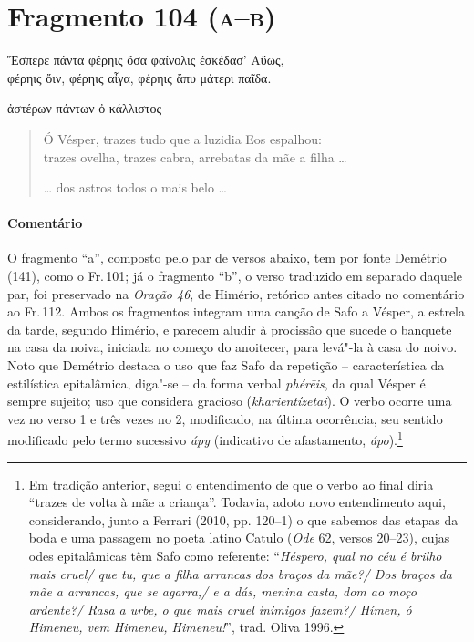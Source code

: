 \pagebreak
\section{Fragmento 104 (\textsc{a--b})}

\begin{gkverse}
Ἔσπερε πάντα φέρηις ὄσα φαίνολις ἐσκέδασ’ Αὔως,\\
      φέρηις ὄιν, φέρηις αἶγα, φέρηις ἄπυ μάτερι παῖδα.

\ast\quad\ast\quad\ast

ἀστέρων πάντων ὀ κάλλιστος
\end{gkverse}

\begin{verse}
Ó Vésper, trazes tudo que a luzidia Eos espalhou:\\
trazes ovelha, trazes cabra, arrebatas da mãe a filha \ldots{}

\ast\quad\ast\quad\ast

\ldots{} dos astros todos o mais belo \ldots{} 
\end{verse}

{\paragraph{Comentário} O fragmento “a”, composto pelo par de versos abaixo, tem por fonte Demétrio (141),
como o Fr.\,101; já o fragmento “b”, o verso traduzido em separado daquele par,
foi preservado na \textit{Oração 46}, de Himério, retórico antes citado no comentário ao Fr.\,112.
Ambos os fragmentos integram uma canção de Safo a Vésper, a estrela da tarde,
segundo Himério, e parecem aludir à procissão que sucede o banquete na casa da
noiva, iniciada no começo do anoitecer, para levá"-la à casa do noivo.
Noto que Demétrio destaca o uso que faz Safo da repetição -- característica da estilística epitalâmica, diga"-se -- da forma verbal \textit{phérēis}, da qual Vésper é sempre sujeito; uso que considera gracioso (\textit{kharientízetai}). O verbo ocorre uma vez no verso 1 e três vezes no 2, modificado, na última ocorrência, seu sentido modificado pelo termo sucessivo \textit{ápy} (indicativo de afastamento, \textit{ápo}).\footnote{Em tradição anterior, segui o entendimento de que o verbo ao final diria ``trazes de volta à mãe a criança''. Todavia, adoto novo entendimento aqui, considerando, junto a Ferrari (2010, pp. 120--1) o que sabemos das etapas da boda e uma passagem no poeta latino Catulo (\textit{Ode} 62, versos 20--23), cujas odes epitalâmicas têm Safo como referente: ``\textit{Héspero, qual no céu é brilho mais cruel/ que tu, que a filha arrancas dos braços da mãe?/ Dos braços da mãe a arrancas, que se agarra,/ e a dás, menina casta, dom ao moço ardente?/ Rasa a urbe, o que mais cruel inimigos fazem?/ Hímen, ó Himeneu, vem Himeneu, Himeneu!}'', trad. Oliva 1996.} }




